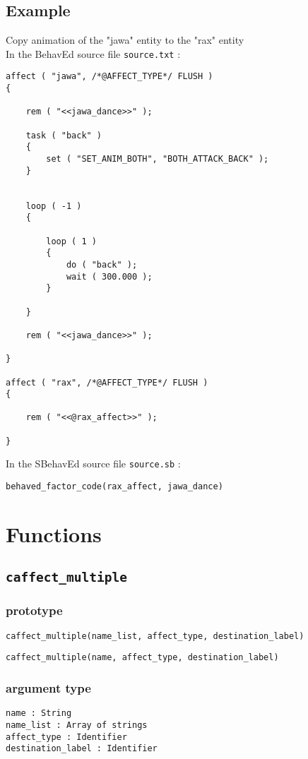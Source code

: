 \documentclass{article}
\begin{document}
\subsection{Example}
Copy animation of the "jawa" entity to the "rax" entity\\
In the BehavEd source file \texttt{source.txt} :
\begin{lstlisting}
affect ( "jawa", /*@AFFECT_TYPE*/ FLUSH )
{

	rem ( "<<jawa_dance>>" );

	task ( "back" )
	{
		set ( "SET_ANIM_BOTH", "BOTH_ATTACK_BACK" );
	}


	loop ( -1 )
	{

		loop ( 1 )
		{
			do ( "back" );
			wait ( 300.000 );
		}

	}

	rem ( "<<jawa_dance>>" );

}

affect ( "rax", /*@AFFECT_TYPE*/ FLUSH )
{

	rem ( "<<@rax_affect>>" );

}
\end{lstlisting}
In the SBehavEd source file \texttt{source.sb} :
\begin{lstlisting}
behaved_factor_code(rax_affect, jawa_dance)
\end{lstlisting}


\newpage
\section{Functions}

\subsection{\texttt{caffect_multiple}}
\subsubsection*{prototype}
\begin{lstlisting}
caffect_multiple(name_list, affect_type, destination_label)
\end{lstlisting}
\begin{lstlisting}
caffect_multiple(name, affect_type, destination_label)
\end{lstlisting}
\subsubsection*{argument type}
\texttt{name : String}\\
\texttt{name_list : Array of strings}\\
\texttt{affect_type : Identifier}\\
\texttt{destination_label : Identifier}
\end{document}
